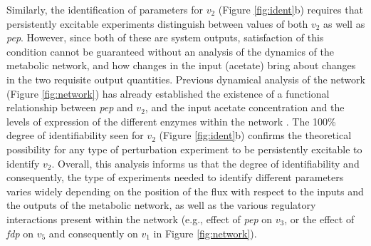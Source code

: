 \documentclass[10pt]{article}
\begin{document}
	Similarly, the identification of parameters for $v_2$ (Figure \ref{fig:ident}b) requires that persistently excitable experiments distinguish between values of both $v_2$ as well as \textit{pep}. However, since both of these are system outputs, satisfaction of this condition cannot be guaranteed without an analysis of the dynamics of the metabolic network, and how changes in the input (acetate) bring about changes in the two requisite output quantities. Previous dynamical analysis of the network (Figure \ref{fig:network}) has already established the existence of a functional relationship between \textit{pep} and $v_2$, and the input acetate concentration and the levels of expression of the different enzymes within the network \parencite{Srinivasan2017}. The 100\% degree of identifiability seen for $v_2$ (Figure \ref{fig:ident}b) confirms the theoretical possibility for any type of perturbation experiment to be persistently excitable to identify $v_2$. Overall, this analysis informs us that the degree of identifiability and consequently, the type of experiments needed to identify different parameters varies widely depending on the position of the flux with respect to the inputs and the outputs of the metabolic network, as well as the various regulatory interactions present within the network (e.g., effect of \textit{pep} on $v_3$, or the effect of \textit{fdp} on $v_5$ and consequently on $v_1$ in Figure \ref{fig:network}). 
	
\end{document}

